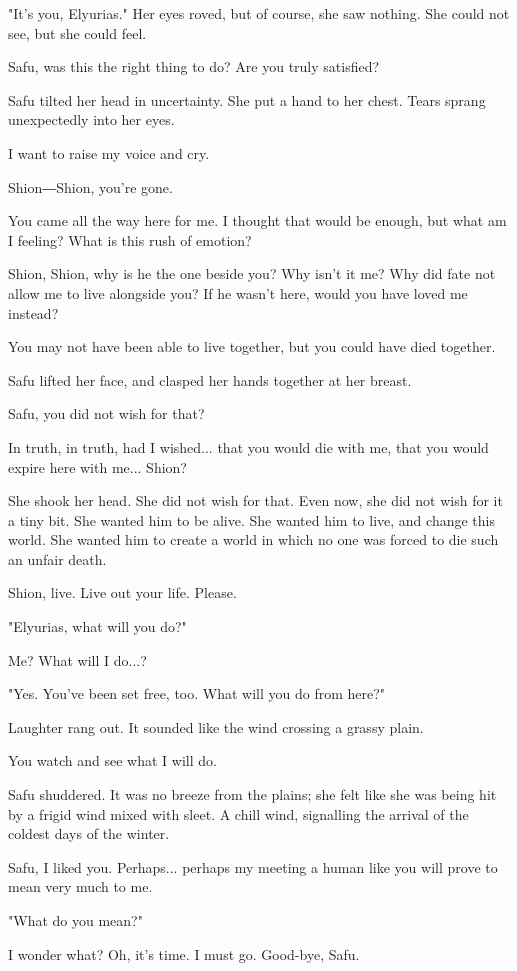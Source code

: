"It's you, Elyurias." Her eyes roved, but of course, she saw nothing.
She could not see, but she could feel.

Safu, was this the right thing to do? Are you truly satisfied?

Safu tilted her head in uncertainty. She put a hand to her chest. Tears
sprang unexpectedly into her eyes.

I want to raise my voice and cry.

Shion―Shion, you're gone.

You came all the way here for me. I thought that would be enough, but
what am I feeling? What is this rush of emotion?

Shion, Shion, why is he the one beside you? Why isn't it me? Why did
fate not allow me to live alongside you? If he wasn't here, would you
have loved me instead?

You may not have been able to live together, but you could have died
together.

Safu lifted her face, and clasped her hands together at her breast.

Safu, you did not wish for that?

In truth, in truth, had I wished... that you would die with me, that you
would expire here with me... Shion?

She shook her head. She did not wish for that. Even now, she did not
wish for it a tiny bit. She wanted him to be alive. She wanted him to
live, and change this world. She wanted him to create a world in which
no one was forced to die such an unfair death.

Shion, live. Live out your life. Please.

"Elyurias, what will you do?"

Me? What will I do...?

"Yes. You've been set free, too. What will you do from here?"

Laughter rang out. It sounded like the wind crossing a grassy plain.

You watch and see what I will do.

Safu shuddered. It was no breeze from the plains; she felt like she was
being hit by a frigid wind mixed with sleet. A chill wind, signalling
the arrival of the coldest days of the winter.

Safu, I liked you. Perhaps... perhaps my meeting a human like you will
prove to mean very much to me.

"What do you mean?"

I wonder what? Oh, it's time. I must go. Good-bye, Safu.

